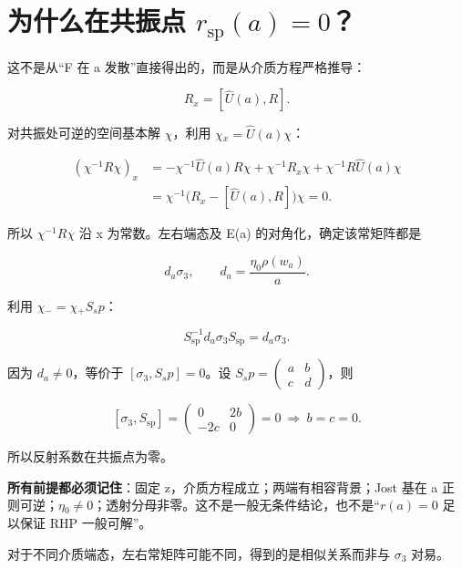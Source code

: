 \section{为什么在共振点 \texorpdfstring{$r_{\mathrm{sp}}(a)=0$}{rsp(a)=0}？}
\par

这不是从“F 在 a 发散”直接得出的，而是从介质方程严格推导：\par

\[
R_x=[\widehat U(a),R].
\]

对共振处可逆的空间基本解 $\chi{}$，利用 $\chi{}_{x}=\widehat U(a)\chi{}$：\par

\[
\begin{aligned}
(\chi^{-1}R\chi)_x
&=-\chi^{-1}\widehat U(a)R\chi
+\chi^{-1}R_x\chi
+\chi^{-1}R\widehat U(a)\chi\\
&=\chi^{-1}\bigl(R_x-[\widehat U(a),R]\bigr)\chi=0.
\end{aligned}
\]

所以 $\chi{}^{-1}R\chi{}$ 沿 x 为常数。左右端态及 E(a) 的对角化，确定该常矩阵都是\par

\[
d_a\sigma_3,\qquad
d_a=\dfrac{\eta_0\rho(w_a)}{a}.
\]

利用 $\chi{}_{-}=\chi{}_{+}S_sp$：\par

\[
S_{\mathrm{sp}}^{-1}d_a\sigma_3S_{\mathrm{sp}}
=d_a\sigma_3.
\]

因为 $d_{a}\ne{}0$，等价于 $[\sigma{}_{3},S_sp]=0$。设 $S_sp=\begin{pmatrix}a&b\\c&d\end{pmatrix}$，则\par

\[
[\sigma_3,S_{\mathrm{sp}}]
=\begin{pmatrix}0&2b\\-2c&0\end{pmatrix}=0
\ \Longrightarrow\ b=c=0.
\]

所以反射系数在共振点为零。\par

\textbf{所有前提都必须记住}：固定 z，介质方程成立；两端有相容背景；Jost 基在 a 正则可逆；$\eta{}_{0}\ne{}0$；透射分母非零。这不是一般无条件结论，也不是“$r(a)=0$ 足以保证 RHP 一般可解”。\par

对于不同介质端态，左右常矩阵可能不同，得到的是相似关系而非与 $\sigma{}_{3}$ 对易。\par

